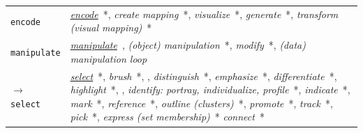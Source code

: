 \begin{table}\renewcommand{\arraystretch}{1.2}\addtolength{\tabcolsep}{-1pt}
    \begin{center}
    \tiny
    \begin{tabular}{p{}>{\RaggedRight}p{}}
    
    \rowcolor{green!20} 
    
        \multicolumn{2}{c}{\it how?} 
        
    \\
    
    \hline \rowcolor{blue!10}
    
        {\tt encode}\index{{\tt encode}} &
    
        	{\it \underline{encode}}~\cite{Chuah1996,Pike2009,Yi2007,Zhou1998}*,
        	{\it create mapping}~\cite{Chuah1996}*,
        	{\it visualize}~\cite{Heer2012,Valiati2006}*,
        	{\it generate}~\cite{Springmeyer1992}*,
        	{\it transform (visual mapping)}~\cite{Chi1998}*
    
    \\ \hline \rowcolor{blue!10} 
        
        {\tt manipulate}\index{{\tt manipulate}} &
    
        	{\it \underline{manipulate}}~\cite{Wilkinson2005},
        	{\it (object) manipulation}~\cite{Mullins1993}*,
        	{\it modify}~\cite{Raskin2000}*,
        	{\it (data) manipulation loop}~\cite{Ware2012}
    
    \\
    
        {\tt $\rightarrow$ select}\index{{\tt select}} &
    
        	{\it \underline{select}}~\cite{Heer2012,Mullins1993,Pike2009,Raskin2000,Ward2004,Yi2007}*, %
        	{\it brush}~\cite{Gotz2008,Keim2002,Pike2009}*, \cite{Chi1998,Ware2012,Wilkinson2005},
        	{\it distinguish}~\cite{Wehrend1990,Zhou1998}*, %
        	{\it emphasize}~\cite{Zhou1998}*,
        	{\it differentiate}~\cite{Pike2009}*,
        	{\it highlight}~\cite{Dix1998,Heer2012,Raskin2000}*, \cite{Ware2012}, %
        	{\it identify: portray, individualize, profile}~\cite{Zhou1998}*, %
        	{\it indicate}~\cite{Mullins1993,Raskin2000}*,
        	{\it mark}~\cite{Mullins1993,Yi2007}*,
        	{\it reference}~\cite{Mullins1993}*,
        	{\it outline (clusters)}~\cite{Zhou1998}*,
        	{\it promote}~\cite{Card1999}*,
        	{\it track}~\cite{Yi2007}*,
        	{\it pick}~\cite{Mullins1993}*\cite{Chi1998},
        	{\it express (set membership)}~\cite{Chuah1996}*
        	{\it connect}~\cite{Pike2009,Yi2007}*
    

\end{tabular}
\end{center}
\end{table}
